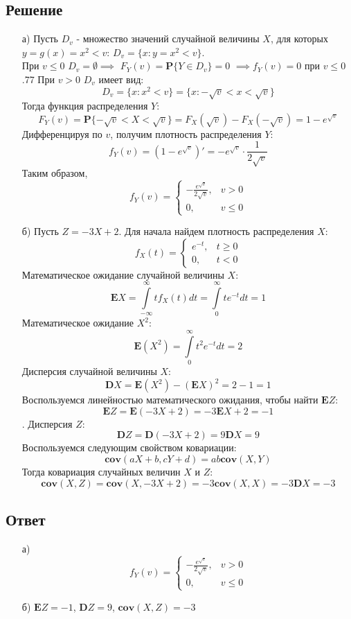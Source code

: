 \documentclass[fleqn, 10pt]{article}
\begin{document}
\subsection{Решение}
\begin{itemize}
\item[а)] Пусть \(D_v\) - множество значений случайной величины \(X\), для которых \(y=g(x)=x^2 < v\): \(D_v=\{x : y = x^2 < v\}\). \\
При \(v \leq 0\) \(D_v = \emptyset \implies\) \mbox{\(F_Y(v) =\textbf{P}\{Y\in D_v\} = 0\)} \(\implies f_Y(v) = 0\) при \(v \leq 0\).77
При \(v > 0\) \(D_v\) имеет вид:
\[D_v = \{x : x^2 < v\} = \{x : -\sqrt{v} < x < \sqrt{v}\}\]
Тогда функция распределения \(Y\):
\[F_Y(v) = \textbf{P}\{-\sqrt{v} < X < \sqrt{v}\} = F_X(\sqrt{v}) - F_X(-\sqrt{v}) = 1 - e^{\sqrt{v}}\]
Дифференцируя по \(v\), получим плотность распределения \(Y\):
\[f_Y(v) = (1 - e^{\sqrt{v}})' = -e^{\sqrt{v}}\cdot\frac{1}{2\sqrt{v}}\]
Таким образом,
\[f_Y(v) =
\begin{cases}
  -\frac{e^{\sqrt{v}}}{2\sqrt{v}}, & v > 0 \\
  0, & v \leq 0
\end{cases}
\]
\item[б)] Пусть \(Z = -3X + 2\).
  Для начала найдем плотность распределения \(X\):
  \[f_X(t) =
  \begin{cases}
    e^{-t}, & t \geq 0 \\
    0, & t < 0
  \end{cases}
  \]
  Математическое ожидание случайной величины \(X\):
  \[\textbf{E}X = \int\limits_{-\infty}^{\infty}{tf_X(t)dt} = \int\limits_{0}^{\infty}{te^{-t}dt} = 1\]
  Математическое ожидание \(X^2\):
  \[\textbf{E}(X^2) = \int\limits_{0}^{\infty}{t^2e^{-t}dt} = 2\]
  Дисперсия случайной величины \(X\):
  \[\textbf{D}X = \textbf{E}(X^2) - (\textbf{E}X)^2 = 2 - 1 = 1\]
  Воспользуемся линейностью математического ожидания, чтобы найти \(\textbf{E}Z\):
  \[\textbf{E}Z = \textbf{E}(-3X+2) = -3\textbf{E}X + 2 = -1\].
  Дисперсия \(Z\):
  \[\textbf{D}Z = \textbf{D}(-3X+2) = 9\textbf{D}X = 9\]
  Воспользуемся следующим свойством ковариации:
  \[\textbf{cov}(aX+b, cY+d) = ab\textbf{cov}(X,Y)\]
  Тогда ковариация случайных величин \(X\) и \(Z\):
  \[\textbf{cov}(X, Z) = \textbf{cov}(X, -3X+2) = -3\textbf{cov}(X, X) = -3\textbf{D}X = -3\]
  \end{itemize}
\subsection{Ответ}
\begin{itemize}
\item[а)]
  \[f_Y(v) =
\begin{cases}
  -\frac{e^{\sqrt{v}}}{2\sqrt{v}}, & v > 0 \\
  0, & v \leq 0
\end{cases}
\]
\item[б)] \(\textbf{E}Z = -1\), \(\textbf{D}Z = 9\), \(\textbf{cov}(X,Z) = -3\)
\end{itemize}
\newpage
\end{document}
